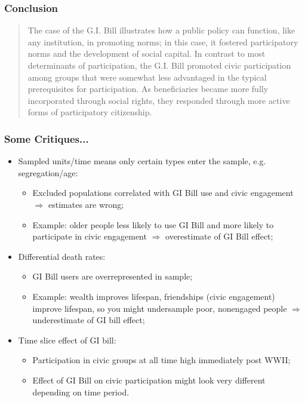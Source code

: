 \documentclass[aspectratio=169]{beamer}
\theoremstyle{principle}
\begin{document}
\begin{frame}
\frametitle{Conclusion}
\begin{quote}
The case of the G.I. Bill illustrates how a public policy can function, like any institution, in promoting norms; in this case, it fostered participatory norms and the development of social capital. In contrast to most determinants of participation, the G.I. Bill promoted civic participation among groups that were somewhat less advantaged in the typical prerequisites for participation. As beneficiaries became more fully incorporated through social rights, they responded through more active forms of participatory citizenship.
\end{quote}

\end{frame}

\begin{frame}
\frametitle{Some Critiques...}
\begin{itemize}

\item Sampled units/time means only certain types enter the sample, e.g. segregation/age:
\begin{itemize}
\item Excluded populations correlated with GI Bill use and civic engagement $\Rightarrow$ estimates are wrong;
\item Example: older people less likely to use GI Bill and more likely to participate in civic engagement $\Rightarrow$ overestimate of GI Bill effect;
\end{itemize}
\bigskip
\item Differential death rates:
\begin{itemize} 
\item GI Bill users are overrepresented in sample;
\item Example: wealth improves lifespan, friendships (civic engagement) improve lifespan, so you might undersample poor, nonengaged people $\Rightarrow$ underestimate of GI bill effect;
\end{itemize}
\bigskip
\item Time slice effect of GI bill:
\begin{itemize}
\item Participation in civic groups at all time high immediately post WWII; 
\item Effect of GI Bill on civic participation might look very different depending on time period.
\end{itemize}

\end{itemize}

\end{frame}
\end{document}
